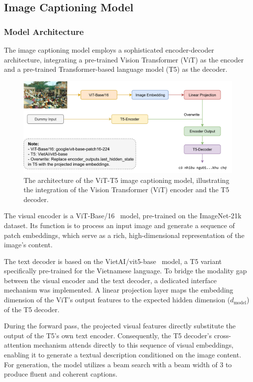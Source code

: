 \subsection{Image Captioning Model}

\subsubsection{Model Architecture}
The image captioning model employs a sophisticated encoder-decoder architecture, integrating a pre-trained Vision Transformer (ViT) as the encoder and a pre-trained Transformer-based language model (T5) as the decoder.

\begin{figure}
  \centering
  \includegraphics[width=\textwidth]{image/img-captioning-archi.png}
  \caption{The architecture of the ViT-T5 image captioning model, illustrating the integration of the Vision Transformer (ViT) encoder and the T5 decoder.}
  \label{fig:img_cap_archi}
\end{figure}



The visual encoder is a ViT-Base/16~\cite{google-vit-base-patch16-224} model, pre-trained on the ImageNet-21k dataset. Its function is to process an input image and generate a sequence of patch embeddings, which serve as a rich, high-dimensional representation of the image's content.

The text decoder is based on the VietAI/vit5-base~\cite{phan-etal-2022-vit5} model, a T5 variant specifically pre-trained for the Vietnamese language. To bridge the modality gap between the visual encoder and the text decoder, a dedicated interface mechanism was implemented. A linear projection layer maps the embedding dimension of the ViT's output features to the expected hidden dimension ($d_{\text{model}}$) of the T5 decoder.

During the forward pass, the projected visual features directly substitute the output of the T5's own text encoder. Consequently, the T5 decoder's cross-attention mechanism attends directly to this sequence of visual embeddings, enabling it to generate a textual description conditioned on the image content. For generation, the model utilizes a beam search with a beam width of 3 to produce fluent and coherent captions.

